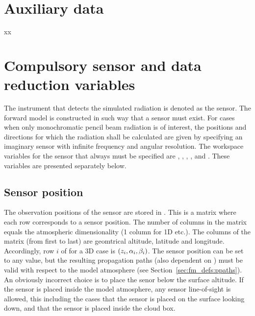 \section{Auxiliary data}
\label{sec:fm_defs:aux}

xx






\section{Compulsory sensor and data reduction variables}
\label{sec:fm_defs:sensor1}

The instrument that detects the simulated radiation is denoted as the
sensor. The forward model is constructed in such
way that a sensor must exist. For cases when only monochromatic pencil
beam radiation is of interest, the positions and directions for which
the radiation shall be calculated are given by specifying an imaginary
sensor with infinite frequency and angular resolution. The workspace
variables for the sensor that always must be specified are
, ,
, ,
 and . These
variables are presented separately
below. 


\subsection{Sensor position}
\label{sec:fm_defs:sensorpos}

The observation positions of the sensor are stored in
. This is a matrix where each row corresponds to
a sensor position. The number of columns in the matrix equals the
atmospheric dimensionality (1 column for 1D etc.). The columns of the
matrix (from first to last) are geomtrical altitude, latitude and longitude.
Accordingly, row $i$ of  for a 3D case is
$(z_{i},\alpha_{i},\beta_{i})$. The sensor position can be set to any
value, but the resulting propagation paths (also dependent on
) must be valid with respect to the model
atmosphere (see Section~\ref{sec:fm_defs:ppaths}). An obviously
incorrect choice is to place the senor below the surface altitude. If
the sensor is placed inside the model atmosphere, any sensor
line-of-sight is allowed, this including the cases that the sensor is
placed on the surface looking down, and that the sensor is placed
inside the cloud box.

